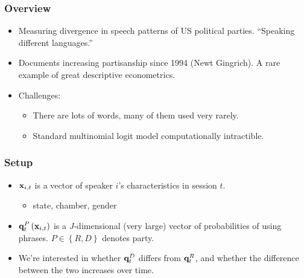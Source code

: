 \documentclass[aspectratio=169,11pt]{beamer}
\begin{document}
\begin{frame}
\frametitle{Overview}
\begin{itemize}
\item Measuring divergence in speech patterns of US political parties. ``Speaking
different languages.'' 

\smallskip
\item Documents increasing partisanship since 1994 (Newt Gingrich).
		 A rare example of great descriptive econometrics. 

\small
\item Challenges:
\begin{itemize}
	\item There are lots of words, many of them used very rarely.
	\item Standard multinomial logit model computationally intractible.
\end{itemize}
\end{itemize}
\end{frame}



\begin{frame}
\frametitle{Setup}
\begin{itemize}
\item ${\bf x}_{i,t}$ is a vector of speaker $i$'s characteristics in session $t$.
\begin{itemize}
	\item state, chamber, gender
\end{itemize}

\smallskip
\item  ${\bf q}_t^P\left({\bf x}_{i,t}\right)$ is a  $J$-dimensional (very large) vector of probabilities
		of using phrases. $P\in \left\{R,D\right\}$ denotes party.

\smallskip
\item We're interested in whether ${\bf q}_t^D$ differs from ${\bf q}_t^R$, and whether
		the difference between the two increases over time.
\end{itemize}
\end{frame}
\end{document}
